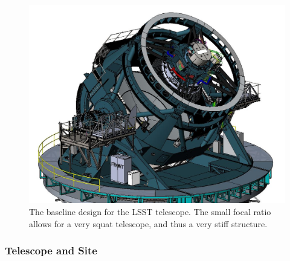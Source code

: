 \begin{figure}
\includegraphics[width=1.0\hsize,clip]{TMA_Image-Oct-2017.JPG}
\caption{The baseline design for the
LSST telescope.  The small focal ratio allows for a very squat
telescope, and thus a very stiff structure.  }
\label{Fig:telescope}
\end{figure}



\subsubsection{ Telescope and Site}

